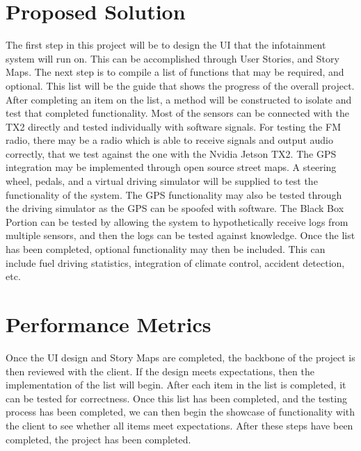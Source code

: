 \documentclass{article}
\begin{document}
\section{Proposed Solution}
The first step in this project will be to design the UI that the infotainment system will run on. This can be accomplished through User Stories, and Story Maps. The next step is to compile a list of functions that may be required, and optional. This list will be the guide that shows the progress of the overall project. After completing an item on the list, a method will be constructed to isolate and test that completed functionality. Most of the sensors can be connected with the TX2 directly and tested individually with software signals. For testing the FM radio, there may be a radio which is able to receive signals and output audio correctly, that we test against the one with the Nvidia Jetson TX2. The GPS integration may be implemented through open source street maps. A steering wheel, pedals, and a virtual driving simulator will be supplied to test the functionality of the system. The GPS functionality may also be tested through the driving simulator as the GPS can be spoofed with software. The Black Box Portion can be tested by allowing the system to hypothetically receive logs from multiple sensors, and then the logs can be tested against knowledge. Once the list has been completed, optional functionality may then be included. This can include fuel driving statistics, integration of climate control, accident detection, etc. 

\section{Performance Metrics}
Once the UI design and Story Maps are completed, the backbone of the project is then reviewed with the client. If the design meets expectations, then the implementation of  the list will begin. After each item in the list is completed, it can be tested for correctness. Once this list has been completed, and the testing process has been completed, we can then begin the showcase of functionality with the client to see whether all items meet expectations. After these steps have been completed, the project has been completed. 
\end{document}
